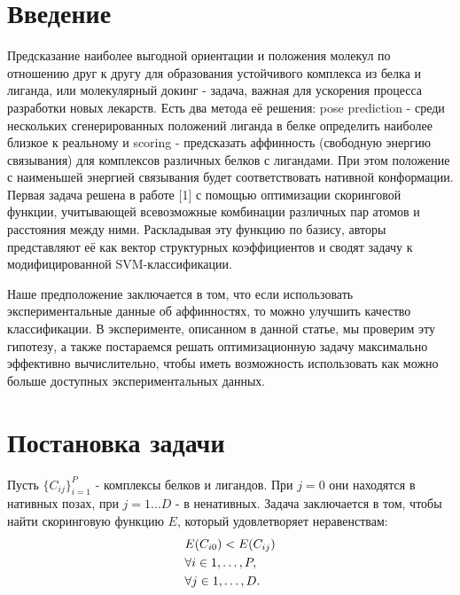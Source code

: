 \documentclass[12pt,twoside]{article}
\title
    {Формулировка и решение задачи оптимизации, сочетающей классификацию и регрессию, 
    для оценки энергии связывания белка и маленьких молекул}
\author
    {Грачева~А.\,С., Соавтор~И.\,О., Фамилия~И.\,О.} %
\begin{document}
\maketitle
\section{Введение}
Предсказание наиболее выгодной ориентации и положения молекул по отношению друг к другу для образования устойчивого комплекса из белка и лиганда, или молекулярный докинг - задача, важная для ускорения процесса разработки новых лекарств.
Есть два метода её решения: pose prediction - среди нескольких сгенерированных положений лиганда в белке определить наиболее близкое к реальному и scoring - предсказать аффинность (свободную энергию связывания) для комплексов различных белков с лигандами. При этом положение с наименьшей энергией связывания будет соответствовать нативной конформации. Первая задача решена в работе [1] с помощью оптимизации скоринговой функции, учитывающей всевозможные комбинации различных пар атомов и расстояния между ними. Раскладывая эту функцию по базису, авторы представляют её как вектор структурных коэффициентов и сводят задачу к модифицированной SVM-классификации.

Наше предположение заключается в том, что если использовать экспериментальные данные об аффинностях, то можно улучшить качество классификации. В эксперименте, описанном в данной статье, мы проверим эту гипотезу, а также постараемся решать оптимизационную задачу максимально эффективно вычислительно, чтобы иметь возможность использовать как можно больше доступных экспериментальных  данных.

\section{Постановка задачи}
Пусть $\{C_{ij}\}_{i=1}^P$ - комплексы белков и лигандов. При $j=0$ они находятся в нативных позах, при $j = 1 \dots D$ - в ненативных. Задача заключается в том, чтобы найти скоринговую функцию $E$, который удовлетворяет неравенствам: 
\begin{equation}\\
\begin{split}
& E(C_{i0}) < E(C_{ij}) \\
& \forall i\in 1,\dots,P, \\
& \forall j\in 1,\dots,D.
\end{split}
\end{equation}
\end{document}
